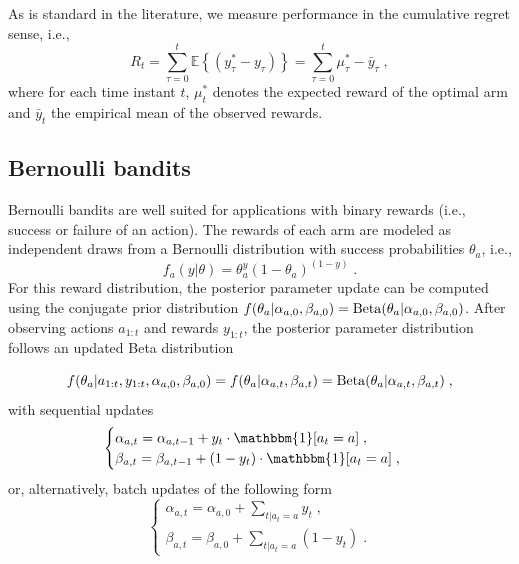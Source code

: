 \documentclass[10pt]{article}
\newcommand{\eValue}[1]{\mathbb{E}\left\{ #1 \right\}}
\newcommand{\ie}{i.e., }
\newcommand{\Beta}{{\rm Beta}}
\begin{document}
As is standard in the literature, we measure performance in the cumulative regret sense, \ie
\begin{equation}
R_t=\sum_{\tau=0}^t \eValue{\left(y^*_{\tau}-y_{\tau} \right)} = \sum_{\tau=0}^t \mu_\tau^*-\bar{y}_{\tau} \; ,
\end{equation}
where for each time instant $t$, $\mu_t^*$ denotes the expected reward of the optimal arm and $\bar{y}_{t}$ the empirical mean of the observed rewards.

\subsection{Bernoulli bandits}
\label{ssec:bernoulli_bandits}

Bernoulli bandits are well suited for applications with binary rewards (\ie success or failure of an action). The rewards of each arm are modeled as independent draws from a Bernoulli distribution with success probabilities $\theta_a$, \ie
\begin{equation}
f_a(y|\theta)=\theta_a^{y}(1-\theta_a)^{(1-y)} \; .
\end{equation}
For this reward distribution, the posterior parameter update can be computed using the conjugate prior distribution $f(\theta_a|\alpha_{a,0}, \beta_{a,0})=\Beta(\theta_a|\alpha_{a,0}, \beta_{a,0})$. After observing actions $a_{1:t}$ and rewards $y_{1:t}$, the posterior parameter distribution follows an updated Beta distribution

\begin{equation}
f(\theta_a|a_{1:t}, y_{1:t}, \alpha_{a,0}, \beta_{a,0}) =f(\theta_a|\alpha_{a,t}, \beta_{a,t})=\Beta(\theta_a|\alpha_{a,t}, \beta_{a,t})  \; ,
\end{equation}
with sequential updates
\begin{equation}
\begin{cases}
\alpha_{a,t}=\alpha_{a,t-1} + y_{t} \cdot \mathbbm{1}[a_t=a] \; ,\\
\beta_{a,t}=\beta_{a,t-1} + (1 - y_{t}) \cdot \mathbbm{1}[a_t=a] \; ,
\end{cases} 
\end{equation}
or, alternatively, batch updates of the following form
\begin{equation}
\begin{cases}
\alpha_{a,t}=\alpha_{a,0} + \sum_{t|a_t=a} y_{t} \; ,\\
\beta_{a,t}=\beta_{a,0} + \sum_{t|a_t=a} (1-y_{t}) \; .
\end{cases}
\end{equation}
\end{document}
